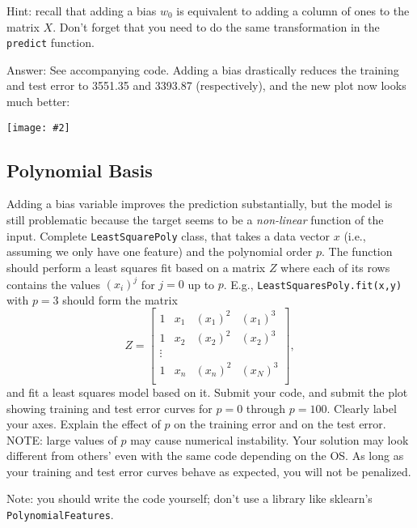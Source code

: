 \documentclass{article}
\def\ans#1{\par\gre{Answer: #1}}
\def\answer#1{\ans{#1}}
\def\blu#1{{\color{blu}#1}}
\def\gre#1{{\color{gre}#1}}
\def\red#1{{\color{red}#1}}
\newcommand{\centerfig}[2]{\begin{center}\texttt{[image: \#2]}\end{center}}
\begin{document}
Hint: recall that adding a bias $w_0$ is equivalent to adding a column of ones to the matrix $X$. Don't forget that you need to do the same transformation in the \texttt{predict} function.

\answer{
See accompanying code.
Adding a bias drastically reduces the training and test error to 3551.35 and 3393.87 (respectively), and the new plot now looks much better:\\
\centerfig{.7}{../figs/least_squares_bias.pdf}
}

\subsection{Polynomial Basis}

Adding a bias variable improves the prediction substantially, but the model is still problematic because the target seems to be a \emph{non-linear} function of the input.
Complete \texttt{LeastSquarePoly} class, that takes a data vector $x$ (i.e., assuming we only have one feature) and the polynomial order $p$. The function should perform a least squares fit based on a matrix $Z$ where each of its rows contains the values $(x_{i})^j$ for $j=0$ up to $p$. E.g., \texttt{LeastSquaresPoly.fit(x,y)}  with $p = 3$ should form the matrix
\[
Z =
\left[\begin{array}{cccc}
1 & x_1 & (x_1)^2 & (x_1)^3\\
1 & x_2 & (x_2)^2 & (x_2)^3\\
\vdots\\
1 & x_n & (x_n)^2 & (x_N)^3\\
\end{array}
\right],
\]
and fit a least squares model based on it.
\blu{Submit your code, and submit the plot showing training and test error curves for $p = 0$ through $p= 100$. Clearly label your axes. Explain the effect of $p$ on the training error and on the test error. \red{NOTE: large values of $p$ may cause numerical instability. Your solution may look different from others' even with the same code depending on the OS. As long as your training and test error curves behave as expected, you will not be penalized.}}

Note: you should write the code yourself; don't use a library like sklearn's \texttt{PolynomialFeatures}.
\end{document}
